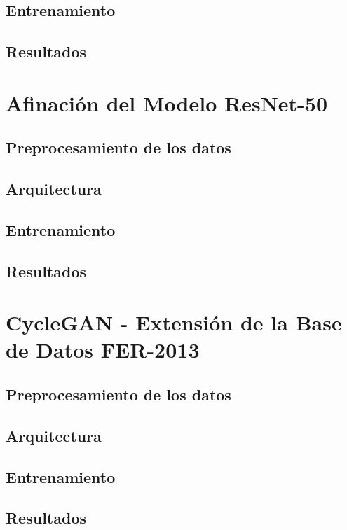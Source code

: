 \subsection{Entrenamiento}

\subsection{Resultados}



\section{Afinación del Modelo ResNet-50}

\subsection{Preprocesamiento de los datos}

\subsection{Arquitectura}

\subsection{Entrenamiento}

\subsection{Resultados}




\section{CycleGAN - Extensión de la Base de Datos FER-2013}

\subsection{Preprocesamiento de los datos}

\subsection{Arquitectura}

\subsection{Entrenamiento}

\subsection{Resultados}